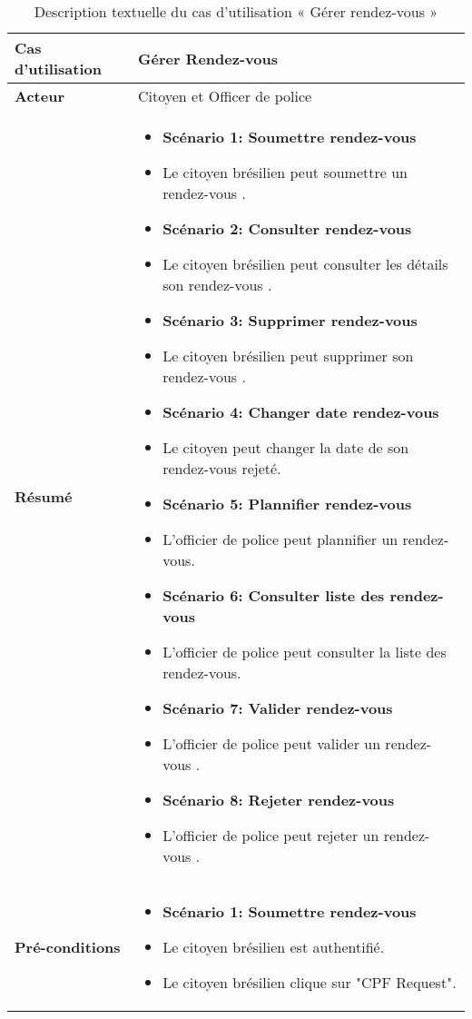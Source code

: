 \begin{longtable}{|>{\arraybackslash}p{4.2cm}|>{\arraybackslash}p{12.5cm}|}
\caption{\centering Description textuelle du cas d'utilisation « Gérer rendez-vous »}
\label{tab:backlog} \\
\hline
\rowcolor{gray!30}
\textbf{Cas d'utilisation} & Gérer Rendez-vous \\
\hline
\endfirsthead

\hline
\endhead

\hline
\endfoot

\hline \hline
\endlastfoot
\textbf{Acteur}  & Citoyen et Officer de police\\
\hline
\textbf{Résumé} &
\begin{itemize}[label=]
\item\textbf{Scénario 1: Soumettre rendez-vous  }
  \item Le citoyen brésilien peut soumettre un rendez-vous .
  \item\textbf{Scénario 2: Consulter rendez-vous }
  \item Le citoyen brésilien peut consulter les détails son rendez-vous .
  \item\textbf{Scénario 3: Supprimer rendez-vous }
  \item Le citoyen brésilien peut supprimer son rendez-vous .
  \item\textbf{Scénario 4: Changer date rendez-vous}
  \item Le citoyen peut changer la date de son rendez-vous rejeté.
  \item\textbf{Scénario 5: Plannifier rendez-vous }
  \item L'officier de police peut plannifier un rendez-vous.
  \item\textbf{Scénario 6: Consulter liste des rendez-vous}
  \item L'officier de police peut consulter la liste des rendez-vous.
  \item\textbf{Scénario 7: Valider rendez-vous }
  \item L'officier de police peut valider un rendez-vous .
  \item\textbf{Scénario 8: Rejeter rendez-vous}
  \item L'officier de police peut rejeter un rendez-vous .
\end{itemize} \\
\hline
\textbf{Pré-conditions} &
\begin{itemize}[label=]
\item\textbf{Scénario 1:  Soumettre rendez-vous }
 \item  Le citoyen brésilien est authentifié.
 \item  Le citoyen brésilien clique sur "CPF Request".
\end{itemize}\\




\end{longtable}
